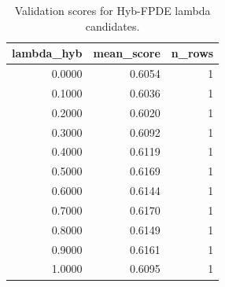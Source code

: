 \begin{table}[t]
\caption{Validation scores for Hyb-FPDE lambda candidates.}
\label{tab:lambda_distribution_computed}
\centering
\begin{tabular}{rrr}
\toprule
lambda\_hyb & mean\_score & n\_rows \\
\midrule
0.0000 & 0.6054 & 1 \\
0.1000 & 0.6036 & 1 \\
0.2000 & 0.6020 & 1 \\
0.3000 & 0.6092 & 1 \\
0.4000 & 0.6119 & 1 \\
0.5000 & 0.6169 & 1 \\
0.6000 & 0.6144 & 1 \\
0.7000 & 0.6170 & 1 \\
0.8000 & 0.6149 & 1 \\
0.9000 & 0.6161 & 1 \\
1.0000 & 0.6095 & 1 \\
\bottomrule
\end{tabular}

\end{table}
